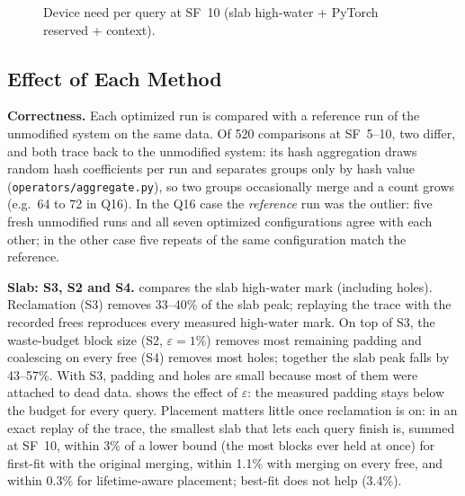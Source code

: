 \documentclass[10pt,twocolumn,letterpaper]{article}
\newcommand{\code}[1]{\texttt{\small #1}}
\begin{document}
\begin{figure}[t]
\centering
{}\need
{}
\caption{Device need per query at SF~10 (slab high-water + PyTorch reserved + context).}
\label{fig:need}
\end{figure}

\subsection{Effect of Each Method}
\textbf{Correctness.} Each optimized run is compared with a reference run of the
unmodified system on the same data. Of 520 comparisons at SF~5--10, two differ, and
both trace back to the unmodified system: its hash aggregation draws random hash
coefficients per run and separates groups only by hash value
(\code{operators/aggregate.py}), so two groups occasionally merge and a count grows
(e.g.\ 64 to 72 in Q16). In the Q16 case the \emph{reference} run was the outlier: five fresh
unmodified runs and all seven optimized configurations agree with each other; in the other
case five repeats of the same configuration match the reference.

\textbf{Slab: S3, S2 and S4.}  compares the slab
high-water mark (including holes). Reclamation (S3) removes 33--40\% of the slab peak;
replaying the trace with the recorded frees reproduces every measured high-water mark. On top of S3, the waste-budget block
size (S2, $\varepsilon=1\%$) removes most remaining padding and coalescing on every free (S4)
removes most holes; together the slab peak falls by 43--57\%. With S3, padding and holes are
small because most of them were attached to dead data.  shows the effect of
$\varepsilon$: the measured padding stays below the budget for every query. Placement
matters little once reclamation is on: in an exact replay of the trace, the smallest slab
that lets each query finish is, summed at SF~10, within 3\% of a lower bound (the most
blocks ever held at once) for first-fit with the original merging, within 1.1\% with
merging on every free, and within 0.3\% for lifetime-aware placement; best-fit does not
help (3.4\%).
\end{document}
